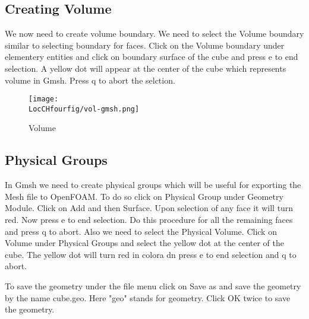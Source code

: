 \subsection{Creating Volume}

We now need to create volume boundary. We need to select the Volume boundary similar to selecting boundary for faces. 
Click on the Volume boundary under elementery entities and click on boundary surface of the cube and press e to end selection. A yellow dot will
appear at the center of the cube which represents volume in Gmsh. Press q to abort the selction.

\begin{figure}[t]  
\begin{center}  
\texttt{[image: \\LocCHfourfig/vol-gmsh.png]}
\caption{Volume}
\label{vol}
\end{center}  
\end{figure}

\subsection{Physical Groups}

In Gmsh we need to create physical groups which will be useful for exporting the Mesh file to OpenFOAM. To do so click on Physical Group under Geometry Module.
Click on Add and then Surface. Upon selection of any face it will turn red. Now press e to end selection. Do this procedure for all the remaining faces
and press q to abort. Also we need to select the Physical Volume. Click on Volume under Physical Groups and select the yellow dot at the center of the cube.
The yellow dot will turn red in colora dn press e to end selection and q to abort.

To save the geometry under the file menu click on Save as and save the geometry by the name cube.geo. Here "geo" stands for geometry. Click OK twice
to save the geometry. 


